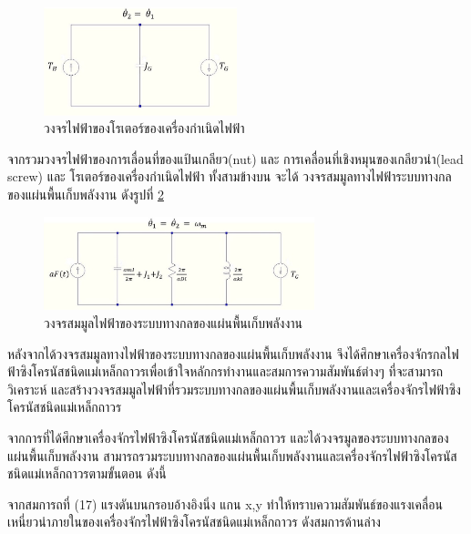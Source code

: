 \documentclass[11pt,a4paper]{article}
\begin{document}
\begin{figure}[H]
    \begin{center}
        \includegraphics[width=0.5\textwidth]{cir3lx.jpg}
    \end{center}
    \caption{วงจรไฟฟ้าของโรเตอร์ของเครื่องกำเนิดไฟฟ้า}
    \label{cir3lx}
\end{figure}
จากรวมวงจรไฟฟ้าของการเลื่อนที่ของแป้นเกลียว(nut) และ การเคลื่อนที่เชิงหมุนของเกลียวนำ(lead screw) และ โรเตอร์ของเครื่องกำเนิดไฟฟ้า ทั้งสามข้างบน จะได้ วงจรสมมูลทางไฟฟ้าระบบทางกลของแผ่นพื้นเก็บพลังงาน ดังรูปที่ \ref{cir4lx}

\begin{figure}[H]
    \begin{center}
        \includegraphics[width=0.7\textwidth]{cir4lx.jpg}
    \end{center}
    \caption{วงจรสมมูลไฟฟ้าของระบบทางกลของแผ่นพื้นเก็บพลังงาน}
    \label{cir4lx}
\end{figure}

หลังจากได้วงจรสมมูลทางไฟฟ้าของระบบทางกลของแผ่นพื้นเก็บพลังงาน จึงได้ศึกษาเครื่องจักรกลไฟฟ้าซิงโครนัสชนิดแม่เหล็กถาวรเพื่อเข้าใจหลักกรทำงานและสมการความสัมพันธ์ต่างๆ ที่จะสามารถวิเคราะห์ และสร้างวงจรสมมูลไฟฟ้าที่รวมระบบทางกลของแผ่นพื้นเก็บพลังงานและเครื่องจักรไฟฟ้าซิงโครนัสชนิดแม่เหล็กถาวร

จากการที่ได้ศึกษาเครื่องจักรไฟฟ้าซิงโครนัสชนิดแม่เหล็กถาวร และได้วงจรมูลของระบบทางกลของแผ่นพื้นเก็บพลังงาน สามารถรวมระบบทางกลของแผ่นพื้นเก็บพลังงานและเครื่องจักรไฟฟ้าซิงโครนัสชนิดแม่เหล็กถาวรตามขั้นตอน ดังนี้

จากสมการถที่ (17) แรงดันบนกรอบอ้างอิงนิ่ง แกน x,y ทำให้ทราบความสัมพันธ์ของแรงเคลื่อนเหนี่ยวนำภายในของเครื่องจักรไฟฟ้าซิงโครนัสชนิดแม่เหล็กถาวร ดังสมการด้านล่าง
\end{document}
